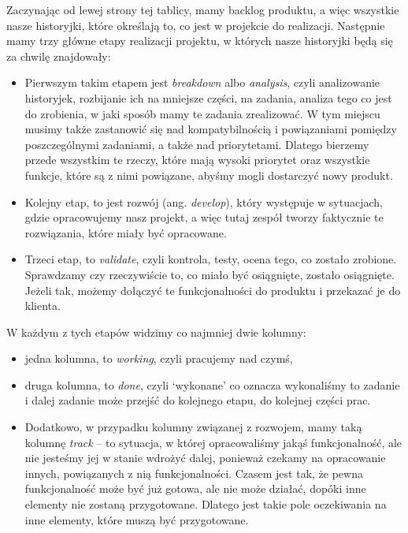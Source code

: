 Zaczynając od lewej strony tej tablicy, mamy backlog produktu, a więc wszystkie nasze historyjki,
które określają to, co jest w projekcie do realizacji.
Następnie mamy trzy główne etapy realizacji projektu, w których nasze historyjki będą się za chwilę znajdowały:

\begin{itemize}
	\item Pierwszym takim etapem jest \textit{breakdown} albo \textit{analysis}, czyli analizowanie historyjek,
	rozbijanie ich na mniejsze części, na zadania, analiza tego co jest do zrobienia, w jaki sposób mamy te zadania zrealizować.
	W tym miejscu musimy także zastanowić się nad kompatybilnością i powiązaniami pomiędzy poszczególnymi zadaniami,
	a także nad priorytetami. Dlatego bierzemy przede wszystkim te rzeczy, które mają wysoki priorytet oraz wszystkie funkcje,
	które są z nimi powiązane, abyśmy mogli dostarczyć nowy produkt.
	\item Kolejny etap, to jest rozwój (ang. \textit{develop}), który występuje w sytuacjach, gdzie opracowujemy nasz projekt,
	a więc tutaj zespół tworzy faktycznie te rozwiązania, które miały być opracowane.
	\item Trzeci etap, to \textit{validate}, czyli kontrola, testy, ocena tego, co zostało zrobione.
	Sprawdzamy czy rzeczywiście to, co miało być osiągnięte, zostało osiągnięte.
	Jeżeli tak, możemy dołączyć te funkcjonalności do produktu i przekazać je do klienta.
\end{itemize}

W każdym z tych etapów widzimy co najmniej dwie kolumny:

\begin{itemize}
	\item jedna kolumna, to \textit{working}, czyli pracujemy nad czymś,
	\item druga kolumna, to \textit{done}, czyli `wykonane' co oznacza wykonaliśmy to zadanie
	i dalej zadanie może przejść do kolejnego etapu, do kolejnej części prac.
	\item Dodatkowo, w przypadku kolumny związanej z rozwojem, mamy taką kolumnę \textit{track}
	– to sytuacja, w której opracowaliśmy jakąś funkcjonalność,
	ale nie jesteśmy jej w stanie wdrożyć dalej, ponieważ czekamy na opracowanie innych,
	powiązanych z nią funkcjonalności.
	Czasem jest tak, że pewna funkcjonalność może być już gotowa, ale nie może działać,
	dopóki inne elementy nie zostaną przygotowane.
	Dlatego jest takie pole oczekiwania na inne elementy, które muszą być przygotowane.
\end{itemize}

